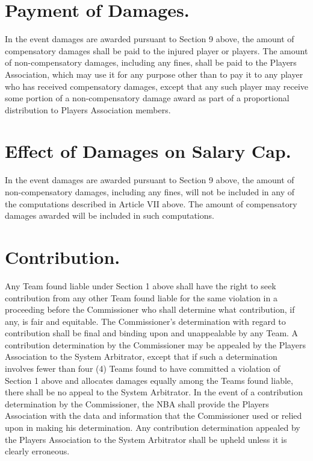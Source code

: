 \documentclass[
]{book}
\begin{document}
\hypertarget{payment-of-damages.}{%
\section{Payment of Damages.}\label{payment-of-damages.}}

In the event damages are awarded pursuant to Section 9 above, the amount of compensatory damages shall be paid to the injured player or players. The amount of non-compensatory damages, including any fines, shall be paid to the Players Association, which may use it for any purpose other than to pay it to any player who has received compensatory damages, except that any such player may receive some portion of a non-compensatory damage award as part of a proportional distribution to Players Association members.

\hypertarget{effect-of-damages-on-salary-cap.}{%
\section{Effect of Damages on Salary Cap.}\label{effect-of-damages-on-salary-cap.}}

In the event damages are awarded pursuant to Section 9 above, the amount of non-compensatory damages, including any fines, will not be included in any of the computations described in Article VII above. The amount of compensatory damages awarded will be included in such computations.

\hypertarget{contribution.}{%
\section{Contribution.}\label{contribution.}}

Any Team found liable under Section 1 above shall have the right to seek contribution from any other Team found liable for the same violation in a proceeding before the Commissioner who shall determine what contribution, if any, is fair and equitable. The Commissioner's determination with regard to contribution shall be final and binding upon and unappealable by any Team. A contribution determination by the Commissioner may be appealed by the Players Association to the System Arbitrator, except that if such a determination involves fewer than four (4) Teams found to have committed a violation of Section 1 above and allocates damages equally among the Teams found liable, there shall be no appeal to the System Arbitrator. In the event of a contribution determination by the Commissioner, the NBA shall provide the Players Association with the data and information that the Commissioner used or relied upon in making his determination. Any contribution determination appealed by the Players Association to the System Arbitrator shall be upheld unless it is clearly erroneous.
\end{document}
